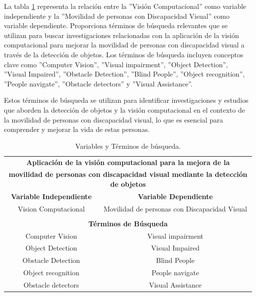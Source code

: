 \documentclass[letterpaper]{article}
\begin{document}
    La tabla \ref{vision-computacional} representa la relación entre la ''Visión Computacional'' como variable independiente y la ''Movilidad de personas con Discapacidad Visual'' como variable dependiente. Proporciona términos de búsqueda relevantes que se utilizan para buscar investigaciones relacionadas con la aplicación de la visión computacional para mejorar la movilidad de personas con discapacidad visual a través de la detección de objetos. Los términos de búsqueda incluyen conceptos clave como ''Computer Vision'', ''Visual impairment'', ''Object Detection'', ''Visual Impaired'', ''Obstacle Detection'', ''Blind People'', ''Object recognition'', ''People navigate'', ''Obstacle detectors'' y ''Visual Assistance''.

    Estos términos de búsqueda se utilizan para identificar investigaciones y estudios que aborden la detección de objetos y la visión computacional en el contexto de la movilidad de personas con discapacidad visual, lo que es esencial para comprender y mejorar la vida de estas personas.

    \begin{table}[hbtp]
    \centering
    \begin{tabular}{@{}cc@{}} \toprule
        \multicolumn{2}{c}{\textbf{Aplicación de la visión computacional para la mejora de la}} \\ 
        \multicolumn{2}{c}{\textbf{ movilidad de personas con discapacidad visual mediante la detección de objetos}} \\ \midrule
        \multicolumn{1}{c}{\textbf{Variable Independiente}} & \multicolumn{1}{c}{\textbf{Variable Dependiente}} \\ \midrule
        Vision Computacional & Movilidad de personas con Discapacidad Visual \\
        & \\
        \toprule
        \multicolumn{2}{c}{\textbf{Términos de Búsqueda}} \\ \midrule
        Computer Vision & Visual impairment  \\
        Object Detection & Visual Impaired  \\
        Obstacle Detection & Blind People  \\
        Object recognition & People navigate  \\
        Obstacle detectors & Visual Assistance  \\ \bottomrule
    \end{tabular}
    \caption{Variables y Términos de búsqueda.}
    \label{vision-computacional}
\end{table}
\end{document}

